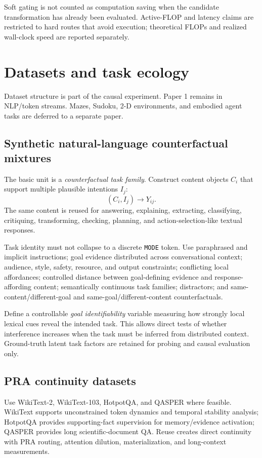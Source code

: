 \documentclass[10pt]{article}
\begin{document}
Soft gating is not counted as computation saving when the candidate transformation has already been evaluated. Active-FLOP and latency claims are restricted to hard routes that avoid execution; theoretical FLOPs and realized wall-clock speed are reported separately.

\section{Datasets and task ecology}
Dataset structure is part of the causal experiment. Paper 1 remains in NLP/token streams. Mazes, Sudoku, 2-D environments, and embodied agent tasks are deferred to a separate paper.

\subsection{Synthetic natural-language counterfactual mixtures}
The basic unit is a \emph{counterfactual task family}. Construct content objects $C_i$ that support multiple plausible intentions $I_j$:
\[
(C_i,I_j)\rightarrow Y_{ij}.
\]
The same content is reused for answering, explaining, extracting, classifying, critiquing, transforming, checking, planning, and action-selection-like textual responses.

Task identity must not collapse to a discrete \texttt{MODE} token. Use paraphrased and implicit instructions; goal evidence distributed across conversational context; audience, style, safety, resource, and output constraints; conflicting local affordances; controlled distance between goal-defining evidence and response-affording content; semantically continuous task families; distractors; and same-content/different-goal and same-goal/different-content counterfactuals.

Define a controllable \emph{goal identifiability} variable measuring how strongly local lexical cues reveal the intended task. This allows direct tests of whether interference increases when the task must be inferred from distributed context. Ground-truth latent task factors are retained for probing and causal evaluation only.

\subsection{PRA continuity datasets}
Use WikiText-2, WikiText-103, HotpotQA, and QASPER where feasible. WikiText supports unconstrained token dynamics and temporal stability analysis; HotpotQA provides supporting-fact supervision for memory/evidence activation; QASPER provides long scientific-document QA. Reuse creates direct continuity with PRA routing, attention dilution, materialization, and long-context measurements.
\end{document}
